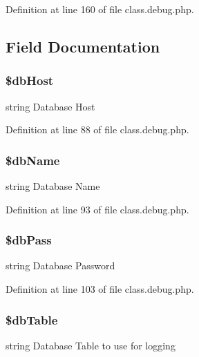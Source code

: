 Definition at line 160 of file class.\-debug.\-php.



\subsection{Field Documentation}
\hypertarget{class_debug_ad0ddb2725e69c88a729e0cc242a1b2a6}{
\subsubsection[{\$db\-Host}]{\setlength{\rightskip}{0pt plus 5cm}\$db\-Host\hspace{0.3cm}{\ttfamily [static]}}}\label{class_debug_ad0ddb2725e69c88a729e0cc242a1b2a6}
string Database Host 

Definition at line 88 of file class.\-debug.\-php.

\hypertarget{class_debug_a68f39949e76b64662a06cb56579d91c3}{
\subsubsection[{\$db\-Name}]{\setlength{\rightskip}{0pt plus 5cm}\$db\-Name\hspace{0.3cm}{\ttfamily [static]}}}\label{class_debug_a68f39949e76b64662a06cb56579d91c3}
string Database Name 

Definition at line 93 of file class.\-debug.\-php.

\hypertarget{class_debug_a30d808caf55f524798c6a5aaafd633ad}{
\subsubsection[{\$db\-Pass}]{\setlength{\rightskip}{0pt plus 5cm}\$db\-Pass\hspace{0.3cm}{\ttfamily [static]}}}\label{class_debug_a30d808caf55f524798c6a5aaafd633ad}
string Database Password 

Definition at line 103 of file class.\-debug.\-php.

\hypertarget{class_debug_adfd23e5286c56c7632ecb55887dd2555}{
\subsubsection[{\$db\-Table}]{\setlength{\rightskip}{0pt plus 5cm}\$db\-Table\hspace{0.3cm}{\ttfamily [static]}}}\label{class_debug_adfd23e5286c56c7632ecb55887dd2555}
string Database Table to use for logging 

